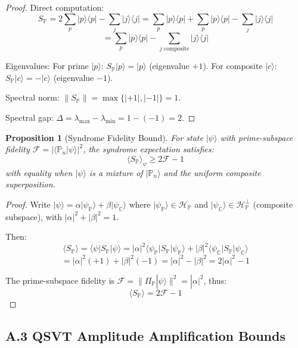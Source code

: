 \documentclass[11pt,letterpaper]{article}
\newtheorem{proposition}{Proposition}
\begin{document}
\begin{proof}
Direct computation:
\[
S_{\mathbb{P}} = 2\sum_p |p\rangle\langle p| - \sum_j |j\rangle\langle j| = \sum_p |p\rangle\langle p| + \sum_p |p\rangle\langle p| - \sum_j |j\rangle\langle j|
\]
\[
= \sum_p |p\rangle\langle p| - \sum_{j \text{ composite}} |j\rangle\langle j|
\]

Eigenvalues: For prime $|p\rangle$: $S_{\mathbb{P}}|p\rangle = |p\rangle$ (eigenvalue $+1$). For composite $|c\rangle$: $S_{\mathbb{P}}|c\rangle = -|c\rangle$ (eigenvalue $-1$).

Spectral norm: $\|S_{\mathbb{P}}\| = \max\{|+1|, |-1|\} = 1$.

Spectral gap: $\Delta = \lambda_{\max} - \lambda_{\min} = 1 - (-1) = 2$.
\end{proof}

\begin{proposition}[Syndrome Fidelity Bound]
For state $|\psi\rangle$ with prime-subspace fidelity $\mathcal{F} = |\langle \mathbb{P}_n|\psi\rangle|^2$, the syndrome expectation satisfies:
\[
\langle S_{\mathbb{P}} \rangle_\psi \geq 2\mathcal{F} - 1
\]
with equality when $|\psi\rangle$ is a mixture of $|\mathbb{P}_n\rangle$ and the uniform composite superposition.
\end{proposition}

\begin{proof}
Write $|\psi\rangle = \alpha|\psi_{\mathbb{P}}\rangle + \beta|\psi_{\mathbb{C}}\rangle$ where $|\psi_{\mathbb{P}}\rangle \in \mathcal{H}_{\mathbb{P}}$ and $|\psi_{\mathbb{C}}\rangle \in \mathcal{H}_{\mathbb{P}}^\perp$ (composite subspace), with $|\alpha|^2 + |\beta|^2 = 1$.

Then:
\[
\langle S_{\mathbb{P}} \rangle = \langle \psi|S_{\mathbb{P}}|\psi\rangle = |\alpha|^2 \langle \psi_{\mathbb{P}}|S_{\mathbb{P}}|\psi_{\mathbb{P}}\rangle + |\beta|^2 \langle \psi_{\mathbb{C}}|S_{\mathbb{P}}|\psi_{\mathbb{C}}\rangle
\]
\[
= |\alpha|^2(+1) + |\beta|^2(-1) = |\alpha|^2 - |\beta|^2 = 2|\alpha|^2 - 1
\]

The prime-subspace fidelity is $\mathcal{F} = \|\Pi_{\mathbb{P}}|\psi\rangle\|^2 = |\alpha|^2$, thus:
\[
\langle S_{\mathbb{P}} \rangle = 2\mathcal{F} - 1
\]
\end{proof}

\subsection{A.3 QSVT Amplitude Amplification Bounds}
\end{document}
